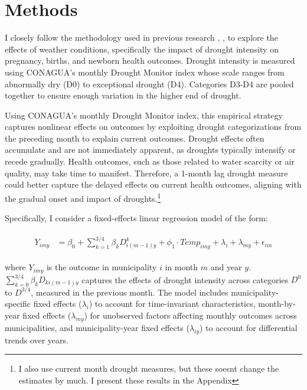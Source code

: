 \documentclass[12pt, oneside]{article}      %
\begin{document}
\clearpage
\newpage




\section{Methods}

I closely follow the methodology used in previous research \cite{Bailey2015}, \cite{Mullins2020}, \cite{Cohen2022} to explore the effects of weather conditions, specifically the impact of drought intensity on pregnancy, births, and newborn health outcomes. Drought intensity is measured using CONAGUA's monthly Drought Monitor index whose scale ranges from abnormally dry (D0) to exceptional drought (D4). Categories D3-D4 are pooled together to ensure enough variation in the higher end of drought.

Using CONAGUA's monthly Drought Monitor index, this empirical strategy captures nonlinear effects on outcomes by exploiting drought categorizations from the preceding month to explain current outcomes. Drought effects often accumulate and are not immediately apparent, as droughts typically intensify or recede gradually. Health outcomes, such as those related to water scarcity or air quality, may take time to manifest. Therefore, a 1-month lag drought measure could better capture the delayed effects on current health outcomes, aligning with the gradual onset and impact of droughts.\footnote{I also use current month drought measures, but these soesnt change the estimates by much. I present these results in the Appendix}

Specifically, I consider a fixed-effects linear regression model of the form:

\begin{align}
\begin{aligned}
Y_{imy} &= \beta_0 + \sum_{k=1}^{3/4} \beta_k D^k_{i(m-1)y} + \phi_1 \cdot Temp_{imy} + \lambda_i + \lambda_{my} + \epsilon_{im}
\end{aligned}
\label{eq:temp_regression}
\end{align}

where $Y_{imy}$ is the outcome in municipality $i$ in month $m$ and year $y$. $\sum_{k=0}^{3/4} \beta_k D_{ki(m-1)y}$ captures the effects of drought intensity across categories $D^0$ to $D^{3/4}$, measured in the previous month. The model includes municipality-specific fixed effects ($\lambda_i$) to account for time-invariant characteristics, month-by-year fixed effects ($\lambda_{my}$) for unobserved factors affecting monthly outcomes across municipalities, and municipality-year fixed effects ($\lambda_{iy}$) to account for differential trends over years.
\end{document}
